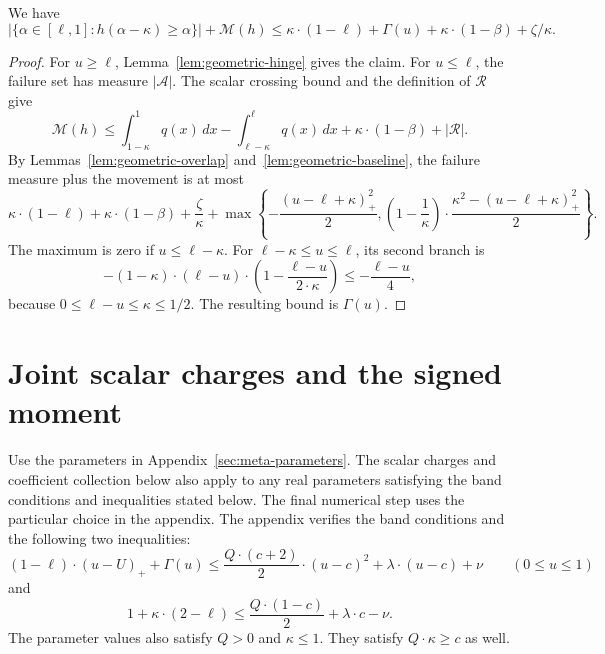 \begin{corollary}
\label{cor:meta-negative-well}
We have
\[
 \bigl|\{\alpha\in[\ell,1]:h(\alpha-\kappa)\ge\alpha\}\bigr|
 +\mathcal M(h)
 \le\kappa\cdot(1-\ell)+\Gamma(u)+\kappa\cdot(1-\beta)+\zeta/\kappa.
\]
\end{corollary}
\begin{proof}
For $u\ge\ell$, Lemma~\ref{lem:geometric-hinge} gives the claim.
For $u\le\ell$, the failure set has measure $|\mathcal A|$. The scalar
crossing bound and the definition of $\mathcal R$ give
\[
 \mathcal M(h)\le\int_{1-\kappa}^{1}q(x)\,dx
 -\int_{\ell-\kappa}^{\ell}q(x)\,dx
 +\kappa\cdot(1-\beta)+|\mathcal R|.
\]
By Lemmas~\ref{lem:geometric-overlap} and~\ref{lem:geometric-baseline},
the failure measure plus the movement is at most
\[
 \kappa\cdot(1-\ell)+\kappa\cdot(1-\beta)+\frac{\zeta}{\kappa}
 +\max\left\{-\frac{(u-\ell+\kappa)_+^2}{2},
   \left(1-\frac1\kappa\right)\cdot
   \frac{\kappa^2-(u-\ell+\kappa)_+^2}{2}\right\}.
\]
The maximum is zero if $u\le\ell-\kappa$. For
$\ell-\kappa\le u\le\ell$, its second branch is
\[
 - (1-\kappa)\cdot(\ell-u)\cdot
 \left(1-\frac{\ell-u}{2\cdot\kappa}\right)
 \le-\frac{\ell-u}{4},
\]
because $0\le\ell-u\le\kappa\le1/2$. The resulting bound is
$\Gamma(u)$.
\end{proof}
\section{Joint scalar charges and the signed moment}
\label{sec:meta-joint}

Use the parameters in Appendix~\ref{sec:meta-parameters}.
The scalar charges and coefficient collection below also apply to any real
parameters satisfying the band conditions and inequalities stated below.
The final numerical step uses the particular choice in the appendix.
The appendix verifies the band conditions and the following two inequalities:
\begin{equation}
 (1-\ell)\cdot(u-U)_++\Gamma(u)
 \le\frac{Q\cdot (c+2)}{2}\cdot(u-c)^2+\lambda\cdot(u-c)+\nu
 \qquad(0\le u\le1)
 \label{eq:meta-majorant}
\end{equation}
and
\begin{equation}
 1+\kappa\cdot(2-\ell)\le\frac{Q\cdot(1-c)}2+\lambda\cdot c-\nu.
 \label{eq:meta-defect-domain}
\end{equation}
The parameter values also satisfy $Q>0$ and $\kappa\le1$.
They satisfy $Q\cdot\kappa\ge c$ as well.

